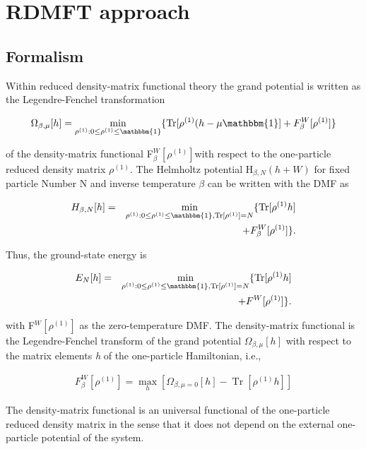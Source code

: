 \documentclass[%
 reprint,
nofootinbib,
 amsmath,amssymb,
 aps,
]{revtex4-2}
\DeclareMathOperator{\Tr}{Tr}
\begin{document}
\section{RDMFT approach}

\subsection{Formalism}
Within reduced density-matrix functional theory the grand potential is written as the Legendre-Fenchel transformation \cite{legendre1787memoire,fenchel1949conjugate}

\begin{eqnarray}
\Omega_{\beta,\mu}[h] = \min_{\rho^{(1)}:0\leq \rho^{(1)} \leq \mathbbm{1}}\{ \Tr[\rho^{(1)}(h-\mu\mathbbm{1}]+F^W_\beta[\rho^{(1)}]\}
\end{eqnarray}

of the density-matrix functional F$^W_\beta[\rho^{(1)}]$with respect to the one-particle reduced density matrix $\rho^{(1)}$. The Helmholtz potential H$_{\beta,N}(h+W)$ for fixed particle Number N and inverse temperature $\beta$ can be written with the DMF as 


\begin{eqnarray}
H_{\beta,N}[h] &=&\min_{\rho^{(1)}:0\leq \rho^{(1)} \leq \mathbbm{1}, \Tr[\rho^{(1)}]=N}\{\Tr[\rho^{(1)}h] \nonumber\\
&&+ F^W_\beta[\rho^{(1)}]\}. 
\end{eqnarray}

Thus, the ground-state energy is 

\begin{eqnarray}
E_N[h] &=&\min_{\rho^{(1)}:0\leq \rho^{(1)} \leq \mathbbm{1}, \Tr[\rho^{(1)}]=N}\{\Tr[\rho^{(1)}h]\nonumber\\
&&+ F^W[\rho^{(1)}]\}. 
\end{eqnarray}

with F$^W[\rho^{(1)}]$ as the zero-temperature DMF. 
The density-matrix functional is the Legendre-Fenchel transform of the grand potential $\Omega_{\beta,\mu}[h]$ with respect to the matrix elements \textit{h} of the one-particle Hamiltonian, i.e., 

\begin{eqnarray}
F^W_\beta[\rho^{(1)}]=\max_h\left[ \Omega_{\beta,\mu=0}[h]-\Tr[\rho^{(1)}h]\right]
\end{eqnarray}

The density-matrix functional is an universal functional of the one-particle reduced density matrix in the sense that it does not depend on the external one-particle potential of the system. \cite{Gilbert1975} 
\end{document}
